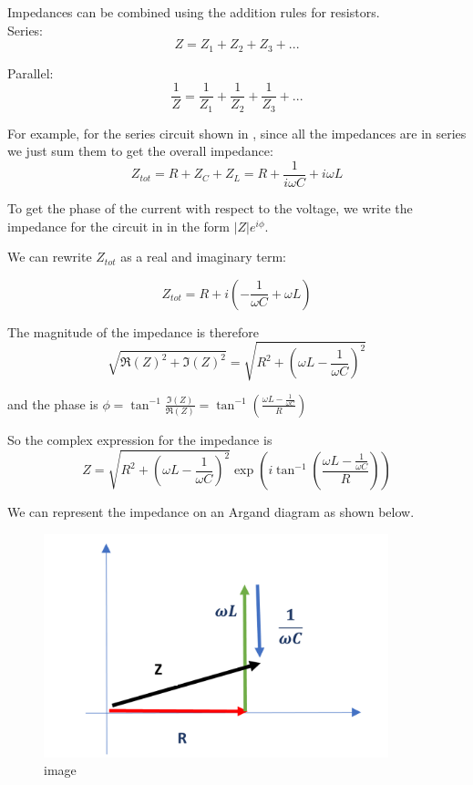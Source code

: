 \documentclass[
]{book}
\numberwithin{equation}{section}
\begin{document}
Impedances can be combined using the addition rules for resistors.\\
Series:
\begin{equation}
\label{eq:ImpedanceSeries}
 Z = Z_1 + Z_2 + Z_3 + ...
\end{equation}

Parallel:
\begin{equation}
\label{eq:ImpParallel}
\frac{1}{Z} = \frac{1}{Z_1} + \frac{1}{Z_2} + \frac{1}{Z_3} + ...
\end{equation}

For example, for the series circuit shown in , since all the impedances
are in series we just sum them to get the overall impedance:
\begin{equation}
\label{eq:ImpOverall}
Z_{tot} = R + Z_C + Z_L = R + \frac{1}{i\omega C} + i\omega L
\end{equation}

To get the phase of the current with respect to the voltage, we write
the impedance for the circuit in in the form \(|Z| e^{i\phi}\).

We can rewrite \(Z_{tot}\) as a real and imaginary term:

\begin{equation}
\label{eq:ZReal-Im}
Z_{tot} = R + i\left( - \frac{1}{\omega C} + \omega L \right) 
\end{equation}

The magnitude of the impedance is therefore
\begin{equation}
\label{eq:Zmag}
\sqrt{ \Re(Z)^2 + \Im(Z)^2 } = \sqrt{ R^2 + \left( \omega L - \frac{1}{\omega C} \right)^2 }
\end{equation}

and the phase is
\(\phi = \tan^{-1}⁡ \frac{\Im(Z)}{ \Re(Z)}= \tan^{-1}⁡\left( \frac{ \omega L - \frac{1}{\omega C} }{R} \right)\)

So the complex expression for the impedance is
\begin{equation}
\label{eq:complexImpedance}
Z = \sqrt{ R^2 + \left(\omega L - \frac{1}{\omega C} \right)^2 } \exp⁡ \left( i \tan^{-1}⁡ \left( \frac{\omega L - \frac{1}{\omega C} }{R} \right)\right)
\end{equation}

We can represent the impedance on an Argand diagram as shown below.

\begin{figure}
\centering
\includegraphics[width=100mm,height=\textheight]{Figures/Z_argand.png}
\caption{image}
\end{figure}
\end{document}
